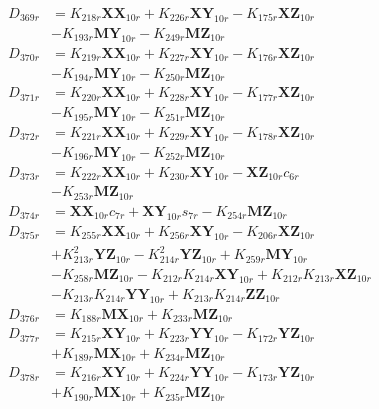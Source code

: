 \begin{align}
D_{369r} &= K_{218r}\mathbf{XX}_{10r} + K_{226r}\mathbf{XY}_{10r} - K_{175r}\mathbf{XZ}_{10r}  \nonumber \\
&- K_{193r}\mathbf{MY}_{10r} - K_{249r}\mathbf{MZ}_{10r} \nonumber \\
D_{370r} &= K_{219r}\mathbf{XX}_{10r} + K_{227r}\mathbf{XY}_{10r} - K_{176r}\mathbf{XZ}_{10r}  \nonumber \\
&- K_{194r}\mathbf{MY}_{10r} - K_{250r}\mathbf{MZ}_{10r} \nonumber \\
D_{371r} &= K_{220r}\mathbf{XX}_{10r} + K_{228r}\mathbf{XY}_{10r} - K_{177r}\mathbf{XZ}_{10r}  \nonumber \\
&- K_{195r}\mathbf{MY}_{10r} - K_{251r}\mathbf{MZ}_{10r} \nonumber \\
D_{372r} &= K_{221r}\mathbf{XX}_{10r} + K_{229r}\mathbf{XY}_{10r} - K_{178r}\mathbf{XZ}_{10r}  \nonumber \\
&- K_{196r}\mathbf{MY}_{10r} - K_{252r}\mathbf{MZ}_{10r} \nonumber \\
D_{373r} &= K_{222r}\mathbf{XX}_{10r} + K_{230r}\mathbf{XY}_{10r} - \mathbf{XZ}_{10r}c_{6r}  \nonumber \\
&- K_{253r}\mathbf{MZ}_{10r} \nonumber \\
D_{374r} &= \mathbf{XX}_{10r}c_{7r} + \mathbf{XY}_{10r}s_{7r} - K_{254r}\mathbf{MZ}_{10r} \nonumber \\
D_{375r} &= K_{255r}\mathbf{XX}_{10r} + K_{256r}\mathbf{XY}_{10r} - K_{206r}\mathbf{XZ}_{10r}  \nonumber \\
&+ K_{213r}^2\mathbf{YZ}_{10r} - K_{214r}^2\mathbf{YZ}_{10r} + K_{259r}\mathbf{MY}_{10r}  \nonumber \\
&- K_{258r}\mathbf{MZ}_{10r} - K_{212r}K_{214r}\mathbf{XY}_{10r} + K_{212r}K_{213r}\mathbf{XZ}_{10r}  \nonumber \\
&- K_{213r}K_{214r}\mathbf{YY}_{10r} + K_{213r}K_{214r}\mathbf{ZZ}_{10r} \nonumber \\
D_{376r} &= K_{188r}\mathbf{MX}_{10r} + K_{233r}\mathbf{MZ}_{10r} \nonumber \\
D_{377r} &= K_{215r}\mathbf{XY}_{10r} + K_{223r}\mathbf{YY}_{10r} - K_{172r}\mathbf{YZ}_{10r}  \nonumber \\
&+ K_{189r}\mathbf{MX}_{10r} + K_{234r}\mathbf{MZ}_{10r} \nonumber \\
D_{378r} &= K_{216r}\mathbf{XY}_{10r} + K_{224r}\mathbf{YY}_{10r} - K_{173r}\mathbf{YZ}_{10r}  \nonumber \\
&+ K_{190r}\mathbf{MX}_{10r} + K_{235r}\mathbf{MZ}_{10r} \nonumber \\

\end{align}
